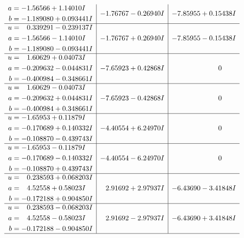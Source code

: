 \documentclass[1p]{elsarticle_modified}
\theoremstyle{definition}
\begin{document}
$$\begin{array}{c|c|c}
\begin{aligned}
a &= -1.56566 + 1.14010 I \\
b &= -1.189080 + 0.093441 I\end{aligned}
 & -1.76767 - 0.26940 I & -7.85955 + 0.15438 I \\ \hline\begin{aligned}
u &= \phantom{-}0.339291 - 0.239137 I \\
a &= -1.56566 - 1.14010 I \\
b &= -1.189080 - 0.093441 I\end{aligned}
 & -1.76767 + 0.26940 I & -7.85955 - 0.15438 I \\ \hline\begin{aligned}
u &= \phantom{-}1.60629 + 0.04073 I \\
a &= -0.209632 - 0.044831 I \\
b &= -0.400984 - 0.348661 I\end{aligned}
 & -7.65923 + 0.42868 I & \phantom{-0.000000 } 0 \\ \hline\begin{aligned}
u &= \phantom{-}1.60629 - 0.04073 I \\
a &= -0.209632 + 0.044831 I \\
b &= -0.400984 + 0.348661 I\end{aligned}
 & -7.65923 - 0.42868 I & \phantom{-0.000000 } 0 \\ \hline\begin{aligned}
u &= -1.65953 + 0.11879 I \\
a &= -0.170689 + 0.140332 I \\
b &= -0.108870 - 0.439743 I\end{aligned}
 & -4.40554 + 6.24970 I & \phantom{-0.000000 } 0 \\ \hline\begin{aligned}
u &= -1.65953 - 0.11879 I \\
a &= -0.170689 - 0.140332 I \\
b &= -0.108870 + 0.439743 I\end{aligned}
 & -4.40554 - 6.24970 I & \phantom{-0.000000 } 0 \\ \hline\begin{aligned}
u &= \phantom{-}0.238593 + 0.068203 I \\
a &= \phantom{-}4.52558 + 0.58023 I \\
b &= -0.172188 + 0.904850 I\end{aligned}
 & \phantom{-}2.91692 + 2.97937 I & -6.43690 - 3.41848 I \\ \hline\begin{aligned}
u &= \phantom{-}0.238593 - 0.068203 I \\
a &= \phantom{-}4.52558 - 0.58023 I \\
b &= -0.172188 - 0.904850 I\end{aligned}
 & \phantom{-}2.91692 - 2.97937 I & -6.43690 + 3.41848 I\\
 \hline 
 \end{array}$$\newpage\newpage\renewcommand{\arraystretch}{1}
\end{document}
